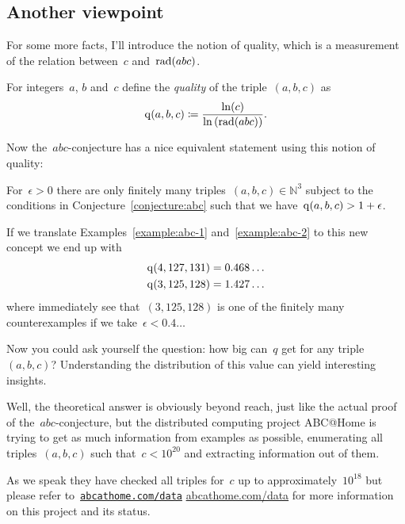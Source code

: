\subsection{Another viewpoint}

For some more facts, I'll introduce the notion of quality, which is a measurement of the relation between~$c$ and~$\operatorname{rad}(abc)$.

\begin{definition}
  For integers~$a$, $b$ and~$c$ define the \emph{quality} of the triple~$(a,b,c)$ as
  \begin{equation}
    \operatorname{q}(a,b,c)\coloneqq\frac{\ln(c)}{\ln\left( \operatorname{rad}(abc) \right)}.
  \end{equation}
\end{definition}

Now the~$abc$\nobreakdash-conjecture has a nice equivalent statement using this notion of quality:

\begin{conjecture}
  For~$\epsilon>0$ there are only finitely many triples~$(a,b,c)\in\mathbb{N}^3$ subject to the conditions in Conjecture~\ref{conjecture:abc} such that we have~$\operatorname{q}(a,b,c)>1+\epsilon$.
\end{conjecture}

If we translate Examples~\ref{example:abc-1} and~\ref{example:abc-2} to this new concept we end up with
\begin{equation}
  \begin{aligned}
    \operatorname{q}(4,127,131)&=0.468\ldots \\
    \operatorname{q}(3,125,128)&=1.427\ldots
  \end{aligned}
\end{equation}
where immediately see that~$(3,125,128)$ is one of the finitely many counterexamples if we take~$\epsilon<0.4\ldots$

Now you could ask yourself the question: how big can~$q$ get for any triple~$(a,b,c)$? Understanding the distribution of this value can yield interesting insights.

Well, the theoretical answer is obviously beyond reach, just like the actual proof of the~$abc$\nobreakdash-con\-jecture, but  the distributed computing project ABC@Home is trying to get as much information from examples as possible, enumerating all triples~$(a,b,c)$ such that~$c<10^{20}$ and extracting information out of them.

As we speak they have checked all triples for~$c$ up to approximately~$10^{18}$ but please refer to~\iftex\href{http://abcathome.com/data/}{\texttt{abcathome.com/data}} \fi\ifblog\href{http://abcathome.com/data/}{abcathome.com/data} \fi for more information on this project and its status.

